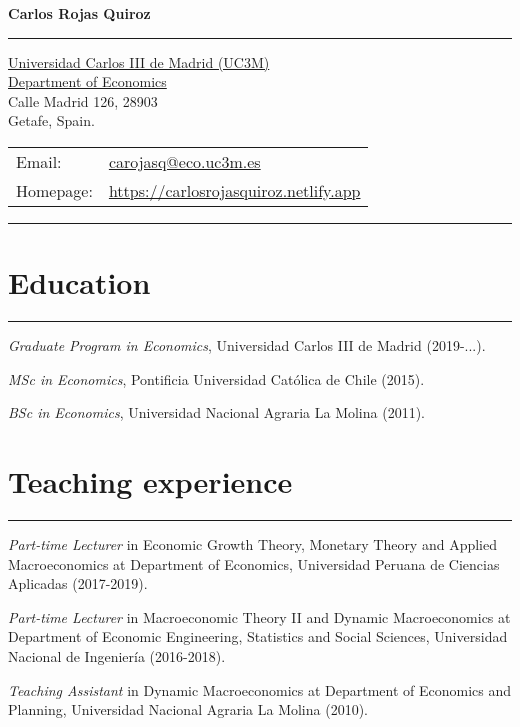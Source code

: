 \documentclass[letterpaper, Biolinum]{article}
\def\name{\textbf{Carlos Rojas Quiroz}}
\renewenvironment{itemize}{
  \begin{list}{}{
    \setlength{\leftmargin}{1.5em}
  }
}{
  \end{list}
}
\begin{document}
{\huge \name}


\hrule 
\vspace{0.10in}
\begin{minipage}{0.45\linewidth}
  \href{http://economics.uc3m.es}{Universidad Carlos III de Madrid (UC3M)} \\
  \href{http://economics.uc3m.es}{Department of Economics} \\
  Calle Madrid 126, 28903 \\
  Getafe, Spain.
\end{minipage}
\begin{minipage}{0.45\linewidth}
  \begin{tabular}{ll}
    Email: & \href{mailto:carojasq@eco.uc3m.es}{carojasq@eco.uc3m.es} \\
    Homepage: & \href{https://carlosrojasquiroz.netlify.app}{https://carlosrojasquiroz.netlify.app} \\
  \end{tabular}
\end{minipage}
\vspace{0.1in}
\hrule

\section*{Education}
\vspace{-0.1in}
\hrule
\vspace{0.1in}
\begin{itemize} 
  \item \textit{Graduate Program in Economics}, Universidad Carlos III de Madrid (2019-...).
  \item \textit{MSc in Economics}, Pontificia Universidad Cat\'olica de Chile (2015).
  \item \textit{BSc in Economics}, Universidad Nacional Agraria La Molina (2011).
\end{itemize}


\section*{Teaching experience}
\vspace{-0.1in}
\hrule
\vspace{0.1in}
\begin{itemize} 
\item \textit{Part-time Lecturer} in Economic Growth Theory, Monetary Theory and Applied Macroeconomics at Department of Economics, Universidad Peruana de Ciencias Aplicadas (2017-2019).
\item \textit{Part-time Lecturer} in Macroeconomic Theory II and Dynamic Macroeconomics at Department of Economic Engineering, Statistics and Social Sciences, Universidad Nacional de Ingenier\'ia (2016-2018).
\item \textit{Teaching Assistant} in Dynamic Macroeconomics at Department of Economics and Planning, Universidad Nacional Agraria La Molina (2010).
\end{itemize}
\end{document}
